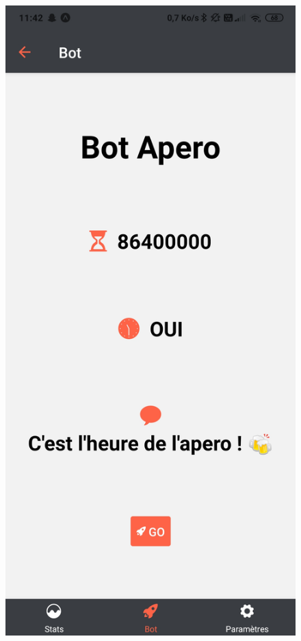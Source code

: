 \documentclass{article}
\begin{document}
\begin{figure}[h!]
\includegraphics[scale=0.1]{images/recap_bot.jpg}

\end{figure}
\end{document}
